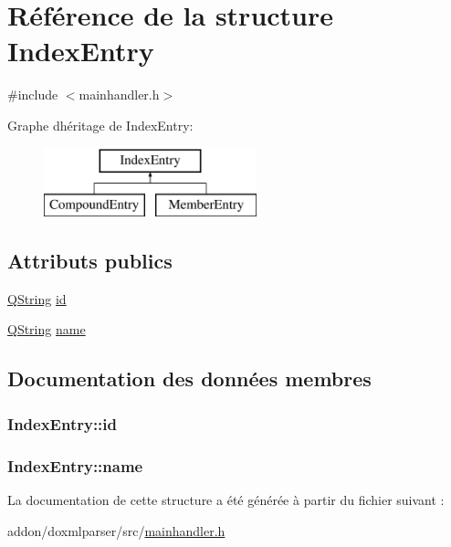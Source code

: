 \hypertarget{struct_index_entry}{}\section{Référence de la structure Index\+Entry}
\label{struct_index_entry}


{\ttfamily \#include $<$mainhandler.\+h$>$}

Graphe d\textquotesingle{}héritage de Index\+Entry\+:\begin{figure}[H]
\begin{center}
\leavevmode
\includegraphics[height=2.000000cm]{struct_index_entry}
\end{center}
\end{figure}
\subsection*{Attributs publics}
\begin{DoxyCompactItemize}
\item 
\hyperlink{class_q_string}{Q\+String} \hyperlink{struct_index_entry_a9e610928614a789b62200befb08af82d}{id}
\item 
\hyperlink{class_q_string}{Q\+String} \hyperlink{struct_index_entry_a8901d67955ab91e97f4a8152eacf30dc}{name}
\end{DoxyCompactItemize}


\subsection{Documentation des données membres}
\hypertarget{struct_index_entry_a9e610928614a789b62200befb08af82d}{}
\subsubsection[{id}]{ Index\+Entry\+::id}\label{struct_index_entry_a9e610928614a789b62200befb08af82d}
\hypertarget{struct_index_entry_a8901d67955ab91e97f4a8152eacf30dc}{}
\subsubsection[{name}]{ Index\+Entry\+::name}\label{struct_index_entry_a8901d67955ab91e97f4a8152eacf30dc}


La documentation de cette structure a été générée à partir du fichier suivant \+:\begin{DoxyCompactItemize}
\item 
addon/doxmlparser/src/\hyperlink{mainhandler_8h}{mainhandler.\+h}\end{DoxyCompactItemize}
